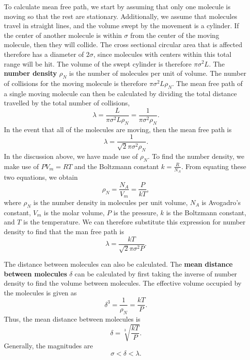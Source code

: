 \documentclass[11pt]{article}
\theoremstyle{plain} %
\theoremstyle{definition}
\theoremstyle{example}
\theoremstyle{remark}
\begin{document}
To calculate mean free path, we start by assuming that only one molecule is moving so that the rest are stationary. Additionally, we assume that molecules travel in straight lines, and the volume swept by the movement is a cylinder. If the center of another molecule is within $\sigma$ from the center of the moving molecule, then they will collide. The cross sectional circular area that is affected therefore has a diameter of $2\sigma$, since molecules with centers within this total range will be hit. The volume of the swept cylinder is therefore $\pi \sigma^2L$. The \textbf{number density} $\rho_N$ is the number of molecules per unit of volume. The number of collisions for the moving molecule is therefore $\pi \sigma^2L\rho_N$. The mean free path of a single moving molecule can then be calculated by dividing the total distance travelled by the total number of collisions,
$$\lambda = \frac{L}{\pi \sigma^2 L \rho_N} = \frac{1}{\pi \sigma^2\rho_N}.$$
In the event that all of the molecules are moving, then the mean free path is
$$\lambda = \frac{1}{\sqrt 2 \pi \sigma^2 \rho_N}.$$
In the discussion above, we have made use of $\rho_N$. To find the number density, we make use of $PV_m = RT$ and the Boltzmann constant $k = \frac{R}{N_A}$. From equating these two equations, we obtain 
$$\rho_N = \frac{N_A} {V_m} = \frac{P}{kT},$$
where $\rho_N$ is the number density in molecules per unit volume, $N_A$ is Avogadro's constant, $V_m$ is the molar volume, $P$ is the pressure, $k$ is the Boltzmann constant, and $T$ is the temperature. We can therefore substitute this expression for number density to find that the man free path is 
$$\lambda = \frac{kT}{\sqrt 2 \pi \sigma^2 P}.$$

The distance between molecules can also be calculated. The \textbf{mean distance between molecules} $\delta$ can be calculated by first taking the inverse of number density to find the volume between molecules. The effective volume occupied by the molecules is given as 
$$\delta^3 = \frac{1}{\rho_N} = \frac{kT}{P}.$$
Thus, the mean distance between molecules is 
$$\delta = \sqrt[3]{\frac{kT}{P}}.$$
Generally, the magnitudes are $$\sigma < \delta < \lambda.$$
	
	
	
	
	
	
	
	
	
	
	
	
	
	
	
	
	
	
	
\end{document}
